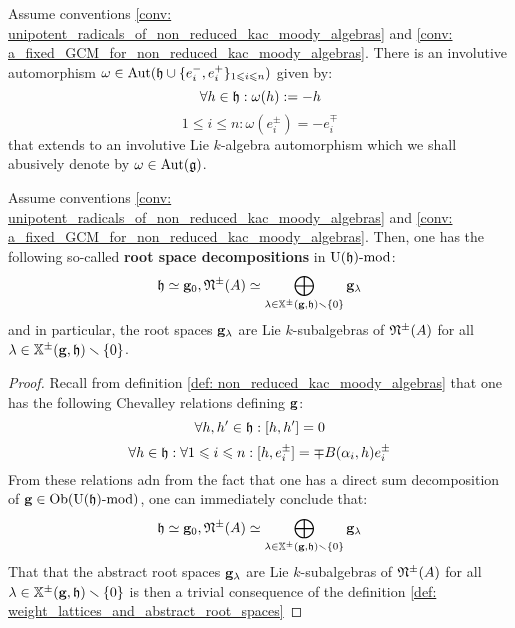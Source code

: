             \begin{corollary} \label{coro: cartan_involutions_on_non_reduced_kac_moody_algebras}
                \cite[Theorem 1.2(c)]{kac_infinite_dimensional_lie_algebras} Assume conventions \ref{conv: unipotent_radicals_of_non_reduced_kac_moody_algebras} and \ref{conv: a_fixed_GCM_for_non_reduced_kac_moody_algebras}. There is an involutive automorphism $\omega \in \mathrm{Aut}(\mathfrak{h} \cup \{e_i^-, e_i^+\}_{1 \leqslant i \leqslant n})$ given by:
                    $$\forall h \in \mathfrak{h}: \omega(h) := -h$$
                    $$1 \leq i \leq n: \omega(e_i^{\pm}) = -e_i^{\mp}$$
                that extends to an involutive Lie $k$-algebra automorphism which we shall abusively denote by $\omega \in \mathrm{Aut}(\mathfrak{g})$. 
            \end{corollary}
            \begin{theorem} \label{theorem: root_space_decomposition_of_non_reduced_kac_moody_algebras}
                \cite[Theorem 1.2(d)]{kac_infinite_dimensional_lie_algebras} Assume conventions \ref{conv: unipotent_radicals_of_non_reduced_kac_moody_algebras} and \ref{conv: a_fixed_GCM_for_non_reduced_kac_moody_algebras}. Then, one has the following so-called \textbf{root space decompositions} in $\mathrm{U}(\mathfrak{h})\text{-}\mathrm{mod}$:
                    $$\mathfrak{h} \simeq \mathbf{g}_0, \mathfrak{N}^{\pm}(A) \simeq \bigoplus_{\lambda \in \mathbb{X}^{\pm}(\mathbf{g}, \mathfrak{h}) \smallsetminus \{0\}} \mathbf{g}_{\lambda}$$
                and in particular, the root spaces $\mathbf{g}_{\lambda}$ are Lie $k$-subalgebras of $\mathfrak{N}^{\pm}(A)$ for all $\lambda \in \mathbb{X}^{\pm}(\mathbf{g}, \mathfrak{h}) \smallsetminus \{0\}$.
            \end{theorem}
                \begin{proof}
                    Recall from definition \ref{def: non_reduced_kac_moody_algebras} that one has the following Chevalley relations defining $\mathbf{g}$:
                        $$\forall h, h' \in \mathfrak{h}: [h, h'] = 0$$
                        $$\forall h \in \mathfrak{h}: \forall 1 \leqslant i \leqslant n: [h, e_i^{\pm}] = \mp B(\alpha_i, h) e_i^{\pm}$$
                    From these relations adn from the fact that one has a direct sum decomposition of $\mathbf{g} \in \mathrm{Ob}(\mathrm{U}(\mathfrak{h})\text{-}\mathrm{mod})$, one can immediately conclude that:
                        $$\mathfrak{h} \simeq \mathbf{g}_0, \mathfrak{N}^{\pm}(A) \simeq \bigoplus_{\lambda \in \mathbb{X}^{\pm}(\mathbf{g}, \mathfrak{h}) \smallsetminus \{0\}} \mathbf{g}_{\lambda}$$
                    That that the abstract root spaces $\mathbf{g}_{\lambda}$ are Lie $k$-subalgebras of $\mathfrak{N}^{\pm}(A)$ for all $\lambda \in \mathbb{X}^{\pm}(\mathbf{g}, \mathfrak{h}) \smallsetminus \{0\}$ is then a trivial consequence of the definition \ref{def: weight_lattices_and_abstract_root_spaces}
                \end{proof}
